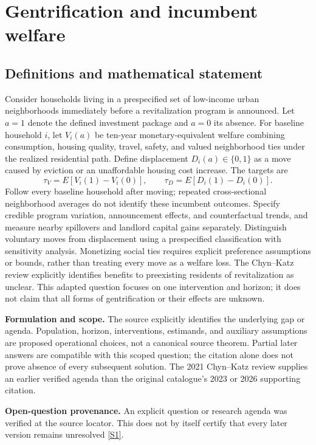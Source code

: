 \documentclass[11pt]{article}
\newcommand{\sref}[2]{\hyperlink{source:#1:#2}{[S#2]}}
\begin{document}
\section*{Gentrification and incumbent welfare}\label{30007747}
\subsection{Definitions and mathematical statement}
Consider households living in a prespecified set of low-income urban neighborhoods immediately before a revitalization program is announced. Let \(a=1\) denote the defined investment package and \(a=0\) its absence. For baseline household \(i\), let \(V_i(a)\) be ten-year monetary-equivalent welfare combining consumption, housing quality, travel, safety, and valued neighborhood ties under the realized residential path. Define displacement \(D_i(a)\in\{0,1\}\) as a move caused by eviction or an unaffordable housing cost increase. The targets are
\[\tau_V=E[V_i(1)-V_i(0)],\qquad\tau_D=E[D_i(1)-D_i(0)].\]
Follow every baseline household after moving; repeated cross-sectional neighborhood averages do not identify these incumbent outcomes. Specify credible program variation, announcement effects, and counterfactual trends, and measure nearby spillovers and landlord capital gains separately. Distinguish voluntary moves from displacement using a prespecified classification with sensitivity analysis. Monetizing social ties requires explicit preference assumptions or bounds, rather than treating every move as a welfare loss. The Chyn–Katz review explicitly identifies benefits to preexisting residents of revitalization as unclear. This adapted question focuses on one intervention and horizon; it does not claim that all forms of gentrification or their effects are unknown.

\par\textbf{Formulation and scope.} The source explicitly identifies the underlying gap or agenda. Population, horizon, interventions, estimands, and auxiliary assumptions are proposed operational choices, not a canonical source theorem. Partial later answers are compatible with this scoped question; the citation alone does not prove absence of every subsequent solution. The 2021 Chyn–Katz review supplies an earlier verified agenda than the original catalogue’s 2023 or 2026 supporting citation.

\par\textbf{Open-question provenance.} An explicit question or research agenda was verified at the source locator. This does not by itself certify that every later version remains unresolved \sref{30007747}{1}.
\end{document}
